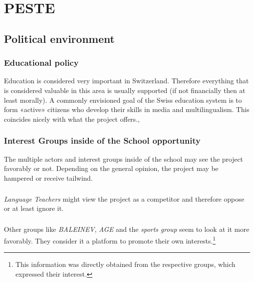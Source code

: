 
\chapter{PESTE} %

\label{ch:examples} %



\section{Political environment}
\subsection{Educational policy} 

\noindent Education is considered very important in Switzerland. Therefore everything that is considered valuable in this area is usually supported (if not financially then at least morally). A commonly envisioned goal of the Swiss education system is to form «active» citizens who develop their skills in media and multilingualism. This coincides nicely with what the project offers.\autocite{zukunft-bildung},\autocite{oecd-pisa2009}

\subsection{Interest Groups inside of the School opportunity} 
\noindent
The multiple actors and interest groups inside of the school may see the project favorably or not. Depending on the general opinion, the project may be hampered or receive tailwind. \autocite{cormen:2001}
\paragraph{}
\emph{Language Teachers} might view the project as a competitor and therefore oppose or at least ignore it.
\paragraph{}
Other groups like \emph{BALEINEV}, \emph{AGE} and the \emph{sports group} seem to look at it more favorably. They consider it a platform to promote their own interests.\footnote{This information was directly obtained from the respective groups, which expressed their interest.}


